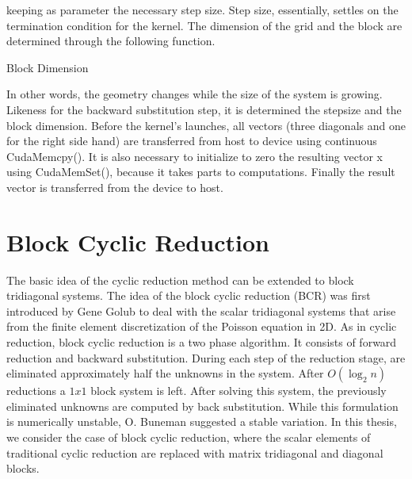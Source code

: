 keeping as parameter the necessary step size. Step size, essentially, settles on the termination condition for the kernel. The dimension of the grid and the block are determined through the following function.

\begin{algorithm}[H]
\begin{algorithmic}[1]
\EndFunction
\end{algorithmic}
\caption{Block Dimension}
\label{alg:calc_dim}
\end{algorithm}
In other words, the geometry changes while the size of the system is growing. 
Likeness for the backward substitution step, it is determined the stepsize and the block dimension.
Before the kernel’s launches, all vectors (three diagonals and one for the right side hand) are transferred from host to device using continuous CudaMemcpy(). It is also necessary to initialize to zero the resulting vector x using CudaMemSet(), because it takes parts to computations. Finally the result vector is transferred from the device to host.

\section{Block Cyclic Reduction}

The basic idea of the cyclic reduction method can be extended to block tridiagonal systems. The idea of the block cyclic reduction (BCR) was first introduced by Gene Golub to deal with the scalar tridiagonal systems that arise from the finite element discretization of the Poisson equation in 2D. As in cyclic reduction, block cyclic reduction is a two phase algorithm. It consists of forward reduction and backward substitution. During each step of the reduction stage, are eliminated approximately half the unknowns in the system. After $O(\log_2 n)$ reductions a $1x1$ block system is left. After solving this system, the previously eliminated unknowns are computed by back substitution. While this formulation is numerically unstable, O. Buneman suggested a stable variation.  In this thesis, we consider the case of block cyclic reduction, where the scalar elements of traditional cyclic reduction are replaced with matrix tridiagonal and diagonal blocks.

